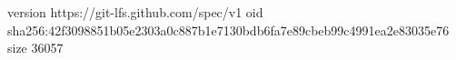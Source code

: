 version https://git-lfs.github.com/spec/v1
oid sha256:42f3098851b05e2303a0c887b1e7130bdb6fa7e89cbeb99c4991ea2e83035e76
size 36057
